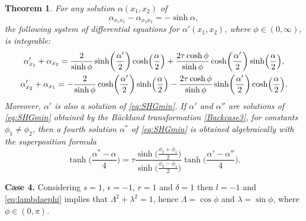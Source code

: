 \documentclass[pdftex]{sigma}
\numberwithin{equation}{section}
\newtheorem{Theorem}{Theorem}[section]
\begin{document}
\begin{Theorem}%
For any solution $\alpha(x_1,x_2)$ of
\begin{equation}\label{eq:SHGmin}
\alpha_{x_1x_1}-\alpha_{x_2x_2}=-\sinh \alpha,
\end{equation}
 the following system of differential equations for $\alpha'(x_1,x_2)$, where $\phi\in(0,\infty)$, is integrable:
\begin{gather}
\alpha'_{x_1}+\alpha_{x_2}=\frac{2}{\sinh\phi}\sinh\biggl(\frac{\alpha'}{2}\biggr)\cosh\Bigl(\frac{\alpha}{2}\Bigr)
+\frac{2\tau\cosh\phi}{\sinh\phi}\cosh\biggl(\frac{\alpha'}{2}\biggr)\sinh\Bigl(\frac{\alpha}{2}\Bigr),\nonumber\\
\alpha'_{x_2}+\alpha_{x_1}=-\frac{2}{\sinh\phi}\cosh\biggl(\frac{\alpha'}{2}\biggr)\sinh\Bigl(\frac{\alpha}{2}\Bigr)
-\frac{2\tau\cosh\phi}{\sinh\phi}\sinh\biggl(\frac{\alpha'}{2}\biggr)\cosh\Bigl(\frac{\alpha}{2}\Bigr).\label{Backcase3}
\end{gather}
Moreover, $\alpha'$ is also a solution of \eqref{eq:SHGmin}.
If $\alpha'$ and $\alpha''$ are solutions of \eqref{eq:SHGmin} obtained by the B\"acklund transformation \eqref{Backcase3}, for constants $\phi_1\neq \phi_2$, then a fourth solution $\alpha^*$ of \eqref{eq:SHGmin} is obtained algebraically with
 the superposition formula
\begin{equation*}%
\tanh\biggl(\frac{\alpha^*-\alpha}{4}\biggr) =
\tau \frac{\sinh\bigl(\frac{\phi_2+\phi_1}{2}\bigr) } {\sinh\bigl(\frac{\phi_2-\phi_1}{2}\bigr)}
\tanh\biggl(\frac{\alpha'-\alpha''}{4}\biggr).
\end{equation*}
\end{Theorem}

{\bf Case 4.}
Considering $s=1$, $\epsilon=-1$, $r=1$ and $\delta=1$ then $l=-1$ and \eqref{eq:lambdaephi} implies that
$\Lambda^2 +\lambda^2=1$, hence $\Lambda=\cos\phi$ and $\lambda=\sin\phi$,
where $\phi\in (0,\pi)$.
\end{document}
